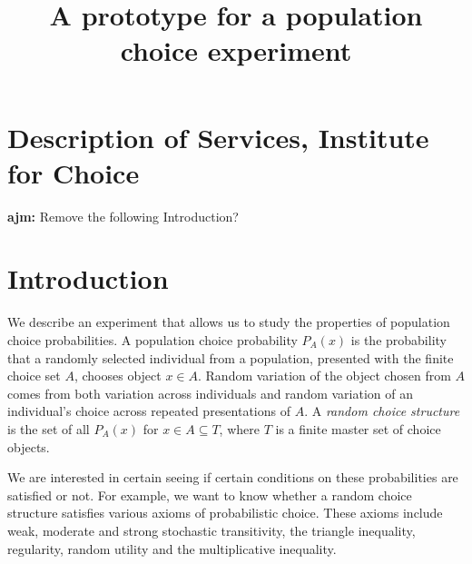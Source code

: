 \documentclass[11pt,letter]{amsart}
\begin{document}
\title{A prototype for a population choice experiment}
\author{}
\maketitle

\section{Description of Services, Institute for Choice }


\bigskip 

\textbf{ajm:} Remove the following Introduction?

\section{Introduction}

We describe an experiment that allows us to study the properties of
population choice probabilities. A population choice probability $P_A(x)$ is
the probability that a randomly selected individual from a population,
presented with the finite choice set $A$, chooses object $x \in A$. Random
variation of the object chosen from $A$ comes from both variation across
individuals and random variation of an individual's choice across repeated
presentations of $A$. A \emph{random choice structure} is the set of all $%
P_A(x)$ for $x \in A \subseteq T$, where $T$ is a finite master set of
choice objects.

We are interested in certain seeing if certain conditions on these
probabilities are satisfied or not. For example, we want to know whether a
random choice structure satisfies various axioms of probabilistic choice.
These axioms include weak, moderate and strong stochastic transitivity, the
triangle inequality, regularity, random utility and the multiplicative
inequality.
\end{document}
